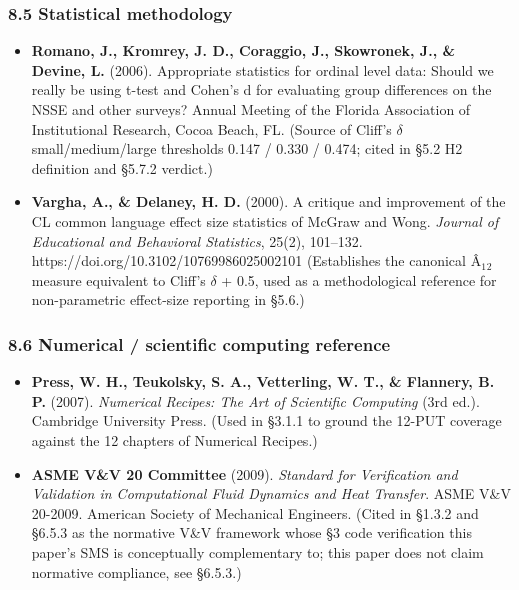 \documentclass[review,12pt,authoryear]{elsarticle}
\providecommand{\tightlist}{\setlength{\itemsep}{0pt}\setlength{\parskip}{0pt}}
\begin{document}
\subsubsection{8.5 Statistical
methodology}\label{statistical-methodology}

\begin{itemize}
\tightlist
\item
  \textbf{Romano, J., Kromrey, J. D., Coraggio, J., Skowronek, J., \&
  Devine, L.} (2006). Appropriate statistics for ordinal level data:
  Should we really be using t-test and Cohen's d for evaluating group
  differences on the NSSE and other surveys? Annual Meeting of the
  Florida Association of Institutional Research, Cocoa Beach, FL.
  (Source of Cliff's $\delta$ small/medium/large thresholds 0.147 / 0.330 /
  0.474; cited in §5.2 H2 definition and §5.7.2 verdict.)
\item
  \textbf{Vargha, A., \& Delaney, H. D.} (2000). A critique and
  improvement of the CL common language effect size statistics of McGraw
  and Wong. \emph{Journal of Educational and Behavioral Statistics},
  25(2), 101--132. https://doi.org/10.3102/10769986025002101
  (Establishes the canonical Â$_{1}$$_{2}$ measure equivalent to Cliff's $\delta$ + 0.5,
  used as a methodological reference for non-parametric effect-size
  reporting in §5.6.)
\end{itemize}

\subsubsection{8.6 Numerical / scientific computing
reference}\label{numerical-scientific-computing-reference}

\begin{itemize}
\tightlist
\item
  \textbf{Press, W. H., Teukolsky, S. A., Vetterling, W. T., \&
  Flannery, B. P.} (2007). \emph{Numerical Recipes: The Art of
  Scientific Computing} (3rd ed.). Cambridge University Press. (Used in
  §3.1.1 to ground the 12-PUT coverage against the 12 chapters of
  Numerical Recipes.)
\item
  \textbf{ASME V\&V 20 Committee} (2009). \emph{Standard for
  Verification and Validation in Computational Fluid Dynamics and Heat
  Transfer}. ASME V\&V 20-2009. American Society of Mechanical
  Engineers. (Cited in §1.3.2 and §6.5.3 as the normative V\&V framework
  whose §3 code verification this paper's SMS is conceptually
  complementary to; this paper does not claim normative compliance, see
  §6.5.3.)
\end{itemize}
\end{document}
